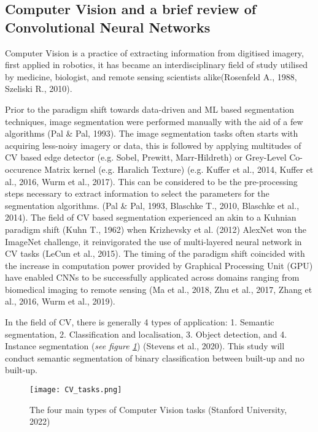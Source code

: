 \documentclass[11pt, a4paper, twoside]{report}
\begin{document}
\subsection{Computer Vision and a brief review of Convolutional Neural Networks}\label{CVinBS}

Computer Vision is a practice of extracting information from digitised imagery, first applied in robotics, it has became an interdisciplinary field of study utilised by medicine, biologist, and remote sensing scientists alike(Rosenfeld A., 1988, Szeliski R., 2010).\\\par

Prior to the paradigm shift towards data-driven and ML based segmentation techniques, image segmentation were performed manually with the aid of a few algorithms (Pal \& Pal, 1993). The image segmentation tasks often starts with acquiring less-noisy imagery or data, this is followed by applying multitudes of CV based edge detector (e.g. Sobel, Prewitt, Marr-Hildreth) or Grey-Level Co-occurence Matrix kernel (e.g. Haralich Texture) (e.g. Kuffer et al., 2014, Kuffer et al., 2016, Wurm et al., 2017). This can be considered to be the pre-processing steps necessary to extract information to select the parameters for the segmentation algorithms. (Pal \& Pal, 1993, Blaschke T., 2010, Blaschke et al., 2014). The field of CV based segmentation experienced an akin to a Kuhnian paradigm shift (Kuhn T., 1962) when Krizhevsky et al. (2012) AlexNet won the ImageNet challenge, it reinvigorated the use of multi-layered neural network in CV tasks (LeCun et al., 2015). The timing of the paradigm shift coincided with the increase in computation power provided by Graphical Processing Unit (GPU) have enabled CNNs to be successfully applicated across domains ranging from biomedical imaging to remote sensing (Ma et al., 2018, Zhu et al., 2017, Zhang et al., 2016, Wurm et al., 2019).\\\par

In the field of CV, there is generally 4 types of application: 1. Semantic segmentation, 2. Classification and localisation, 3. Object detection, and 4. Instance segmentation (\textit{see figure {\ref{fig:CV_tasks}}}) (Stevens et al., 2020). This study will conduct semantic segmentation of binary classification between built-up and no built-up.\\\par

\begin{figure}[H]
\centering
\texttt{[image: CV\_tasks.png]}
  \caption{The four main types of Computer Vision tasks (Stanford University, 2022)}
\label{fig:CV_tasks}
\end{figure}
\end{document}

